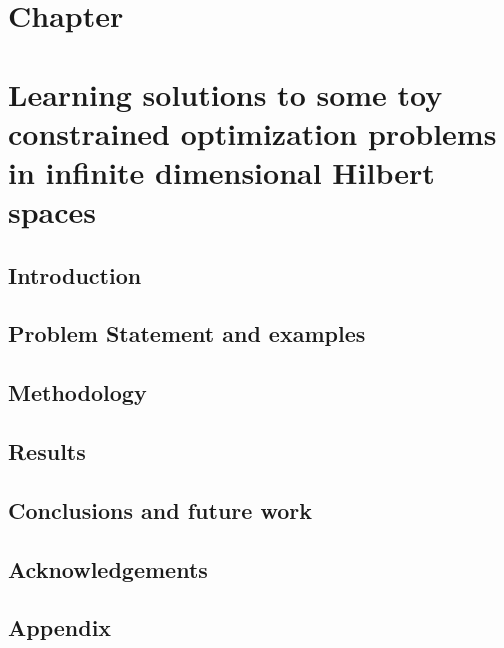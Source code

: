 \chapter*{Chapter }
\textit{}
\newpage

\chapter{Learning solutions to some toy constrained optimization problems in infinite dimensional Hilbert spaces}
\section{Introduction}
\label{sec-intro--var-ml}


\section{Problem Statement and examples}
\label{sec-prob--var-ml}


\section{Methodology}
\label{sec-method--var-ml}


\section{Results}
\label{sec-results--var-ml}



\section{Conclusions and future work}
\label{sec-conclusions--var-ml}


\section*{Acknowledgements}


\section{Appendix}
\label{sec-appendix--var-ml}





